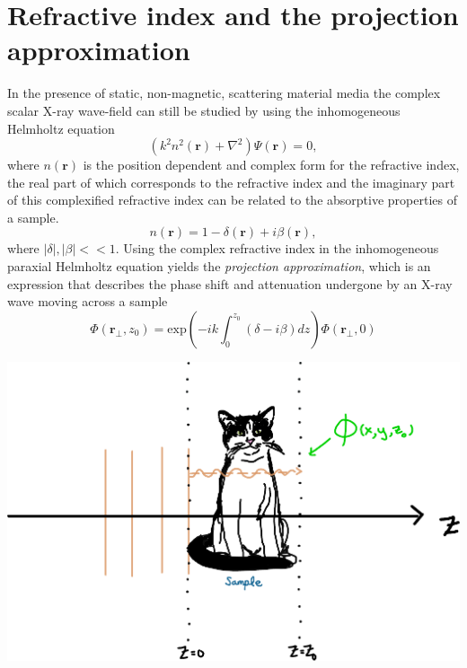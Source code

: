 \documentclass[10pt, a4paper, singlespacing]{report}
\newenvironment{Figure}
    {\par\medskip\noindent\minipage{\linewidth}}
    {\endminipage\par\medskip}
\begin{document}
\section{Refractive index and the projection approximation}\label{PA}

In the presence of static, non-magnetic, scattering material media the complex scalar X-ray wave-field can still be studied by using the inhomogeneous Helmholtz equation 
\begin{equation}\label{eq:10}
\left ( k^2 n^2 (\mathbf{r}) + \nabla^{2}  \right )\Psi(\mathbf{r}) = 0,
\end{equation}
where $n(\mathbf{r})$ is the position dependent and complex form for the refractive index, the real part of which corresponds to the refractive index and the imaginary part of this complexified refractive index can be related to the absorptive properties of a sample\cite{PagsTutes}.
\begin{equation}\label{eq:11}
n(\mathbf{r}) = 1 - \delta(\mathbf{r}) + i \beta(\mathbf{r}),
\end{equation}
where $|\delta|, |\beta| << 1$. Using the complex refractive index in the inhomogeneous paraxial Helmholtz equation yields the \textit{projection approximation}, which is an expression that describes the phase shift and attenuation undergone by an X-ray wave moving across a sample
\begin{equation}\label{eq:12}
\Phi(\mathbf{r}_{\perp}, z_0) = \mathrm{exp} \left ( -ik \int_{0}^{z_0}(\delta - i\beta)dz\right ) \Phi(\mathbf{r}_{\perp}, 0)
\end{equation}
\begin{Figure}
\centering
\includegraphics[width=0.6\linewidth]{projection_approximation.pdf}
\label{fig:1.2}
\end{Figure}
\end{document}
